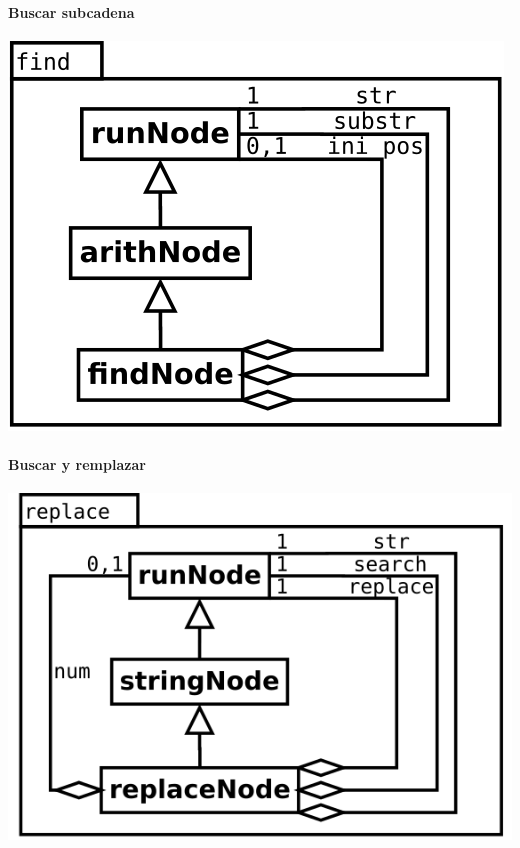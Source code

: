 \paragraph {Buscar subcadena}
\begin{center}
\includegraphics[scale=0.4]{find.png} \\
\end{center}

\paragraph {Buscar y remplazar}
\begin{center}
\includegraphics[scale=0.4]{replace.png} \\
\end{center}

